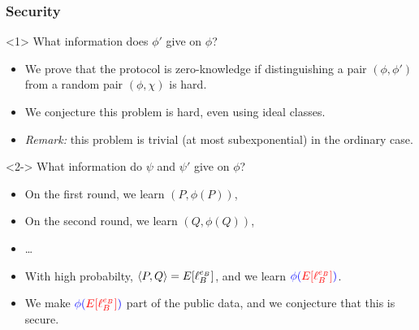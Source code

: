 \documentclass{beamer}
\newcommand{\bl}[1]{\textcolor{blue}{#1}}
\newcommand{\rd}[1]{\textcolor{red}{#1}}
\begin{document}
\begin{frame}
  \frametitle{Security}

  \begin{center}
  \end{center}

  \begin{overlayarea}{\textwidth}{6cm}
    \begin{onlyenv}<1>
      What information does \emph{$\phi'$} give on \emph{$\phi$}?
      \begin{itemize}
      \item We prove that the protocol is zero-knowledge if
        distinguishing a pair \emph{$(\phi,\phi')$} from a random pair
        \emph{$(\phi,\chi)$} is hard.
      \item We conjecture this problem is hard, even using ideal
        classes.
      \item \emph{Remark:} this problem is trivial (at most
        subexponential) in the ordinary case.
      \end{itemize}
    \end{onlyenv}
    
    \begin{onlyenv}<2-> What information do \emph{$\psi$} and
      \emph{$\psi'$} give on \emph{$\phi$}?
      \begin{itemize}
      \item On the first round, we learn \emph{$(P,\phi(P))$},
      \item<3-> On the second round, we learn \emph{$(Q,\phi(Q))$}, 
      \item<3-> \dots
      \item<4-> With high probabilty, \rd{${\langle P,Q \rangle}=E[\ell_B^{e_B}]$},
        and we learn $\bl{\phi(}\rd{E[\ell_B^{e_B}]}\bl{)}$.
      \item<4-> We make $\bl{\phi(}\rd{E[\ell_B^{e_B}]}\bl{)}$ part of the
        public data, and we conjecture that this is secure.
      \end{itemize}
    \end{onlyenv}
  \end{overlayarea}
\end{frame}
\end{document}
